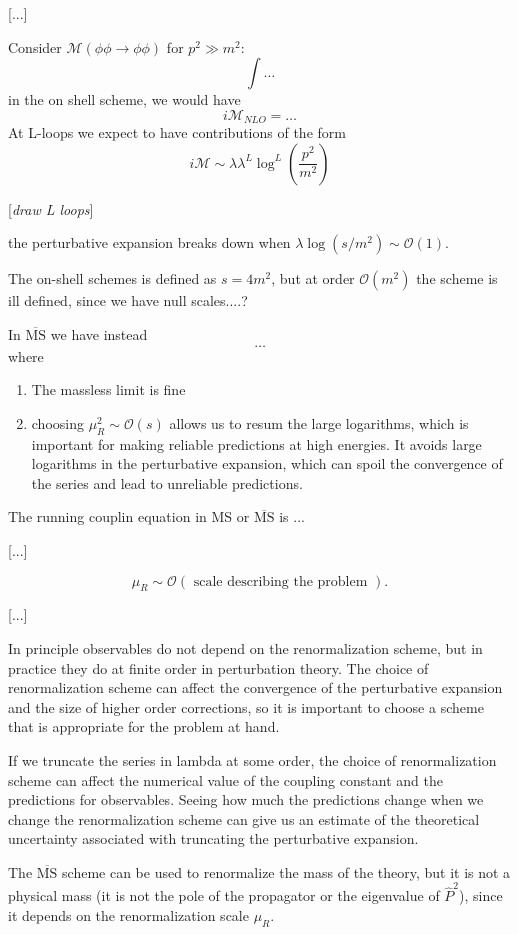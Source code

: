 [...]

Consider \(\mathcal{M}(\phi \phi \to \phi \phi)\) for \(p^2 \gg m^2\):
\[
    \int \dots
\]
in the on shell scheme, we would have
\[
    i \mathcal{M}_{NLO} = \dots
\]
At L-loops we expect to have contributions of the form
\[
    i\mathcal{M} \sim \lambda \lambda^L \log^L \left( \frac{p^2}{m^2} \right)
\]

[\textit{draw L loops}]

the perturbative expansion breaks down when \(\lambda \log(s/m^2) \sim \mathcal{O}(1)\).

The on-shell schemes is defined as \(s = 4m^2\), but at order \(\mathcal{O}(m^2)\) the scheme is ill defined, since we have null scales....?

In \(\overline{\text{MS}}\) we have instead
\[
    \dots
\]
where
\begin{enumerate}
    \item The massless limit is fine
    \item choosing \(\mu_R^2 \sim \mathcal{O}(s)\) allows us to resum the large logarithms, which is important for making reliable predictions at high energies. It avoids large logarithms in the perturbative expansion, which can spoil the convergence of the series and lead to unreliable predictions.
\end{enumerate}

The running couplin equation in MS or \(\overline{\text{MS}}\) is ...

    [...]

\[
    \mu_R \sim \mathcal{O}\left( \text{ scale describing the problem }\right).
\]

[...]

In principle observables do not depend on the renormalization scheme, but in practice they do at finite order in perturbation theory. The choice of renormalization scheme can affect the convergence of the perturbative expansion and the size of higher order corrections, so it is important to choose a scheme that is appropriate for the problem at hand.

If we truncate the series in lambda at some order, the choice of renormalization scheme can affect the numerical value of the coupling constant and the predictions for observables. Seeing how much the predictions change when we change the renormalization scheme can give us an estimate of the theoretical uncertainty associated with truncating the perturbative expansion.

The \(\overline{\text{MS}}\) scheme can be used to renormalize the mass of the theory, but it is not a physical mass (it is not the pole of the propagator or the eigenvalue of \(\hat{P}^2\)), since it depends on the renormalization scale \(\mu_R\).

